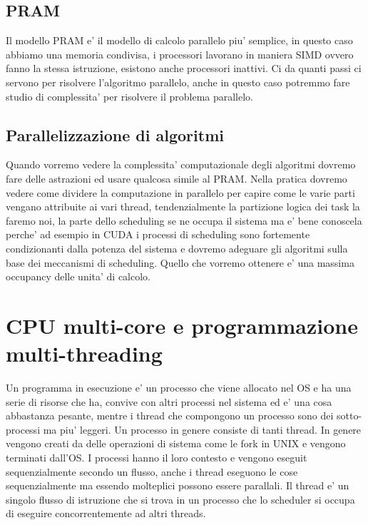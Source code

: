 \subsection{PRAM}
Il modello PRAM e' il modello di calcolo parallelo piu' semplice, in questo caso abbiamo una memoria condivisa, i processori lavorano in maniera SIMD ovvero fanno la stessa istruzione, esistono anche processori inattivi.
Ci da quanti passi ci servono per risolvere l'algoritmo parallelo, anche in questo caso potremmo fare studio di complessita' per risolvere il problema parallelo.

\subsection{Parallelizzazione di algoritmi}
Quando vorremo vedere la complessita' computazionale degli algoritmi dovremo fare delle astrazioni ed usare qualcosa simile al PRAM.
Nella pratica dovremo vedere come dividere la computazione in parallelo per capire come le varie parti vengano attribuite ai vari thread, tendenzialmente la partizione logica dei task la faremo noi, la parte dello scheduling se ne occupa il sistema ma e' bene conoscela perche' ad esempio in CUDA i processi di scheduling sono fortemente condizionanti dalla potenza del sistema e dovremo adeguare gli algoritmi sulla base dei meccanismi di scheduling. Quello che vorremo ottenere e' una massima occupancy delle unita' di calcolo.

\section{CPU multi-core e programmazione multi-threading}
Un programma in esecuzione e' un processo che viene allocato nel OS e ha una serie di risorse che ha, convive con altri processi nel sistema ed e' una cosa abbastanza pesante, mentre i thread che compongono un processo sono dei sotto-processi ma piu' leggeri. Un processo in genere consiste di tanti thread. In genere vengono creati da delle operazioni di sistema come le fork in UNIX e vengono terminati dall'OS.
I processi hanno il loro contesto e vengono eseguit sequenzialmente secondo un flusso, anche i thread eseguono le cose sequenzialmente ma essendo molteplici possono essere parallali.
Il thread e' un singolo flusso di istruzione che si trova in un processo che lo scheduler si occupa di eseguire concorrentemente ad altri threads.

